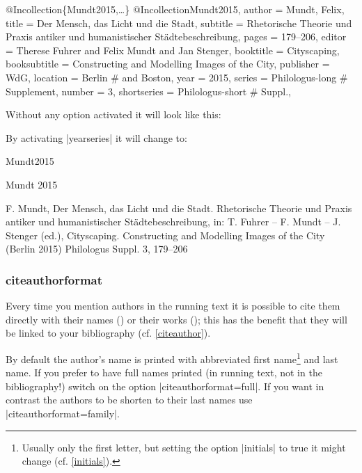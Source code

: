 \documentclass[a4paper,
10pt,
greek,
french,
spanish,
italian,
ngerman,
english,
]{ltxdoc}
\begin{document}
\begin{bibexample}[label=Mundt2015]{{@}Incollection\{Mundt2015,…\}}
@Incollection{Mundt2015,
  author       = {Mundt, Felix},
  title        = {Der Mensch, das Licht und die Stadt},
  subtitle     = {Rhetorische Theorie und Praxis antiker und humanistischer Städtebeschreibung},
  pages        = {179--206},
  editor       = {Therese Fuhrer and Felix Mundt and Jan Stenger},
  booktitle    = {Cityscaping},
  booksubtitle = {Constructing and Modelling Images of the City},
  publisher    = WdG,
  location     = Berlin #{ and Boston}, %
  year         = {2015},
  series       = Philologus-long #{ Supplement},
  number       = {3},
  shortseries  = Philologus-short #{ Suppl.},
}
\end{bibexample}

Without any option activated it will look like this:
 
By activating |yearseries| it will change to:
\begin{bibbox}{Mundt2015}\footnotesize
\parbox[t]{1.7cm}{Mundt 2015} \parbox[t]{9cm}{F. Mundt, Der Mensch, das Licht und die Stadt. Rhetorische Theorie und Praxis antiker und humanistischer Städtebeschreibung, in: T. Fuhrer -- F. Mundt -- J. Stenger (ed.), Cityscaping. Constructing and Modelling Images of the City (Berlin 2015) {\color{red}Philologus Suppl. 3,} 179–206}
\end{bibbox}

\subsubsection{citeauthorformat}\label{citeauthorformat}
Every time you mention authors in the running text it is possible to cite them 
directly with their names () or their works  ();
this has the benefit that they will be linked to your bibliography (cf. \cref{citeauthor}).

By default the author's name is printed with abbreviated first name\footnote{Usually only the first letter, but setting the option |initials| to true it might change (cf. \cref{initials}).} and last name.
If you prefer to have full names printed (in running text, not in the bibliography!) switch on the option |citeauthorformat=full|.
If you want in contrast the authors to be shorten to their last names use |citeauthorformat=family|.
\end{document}

